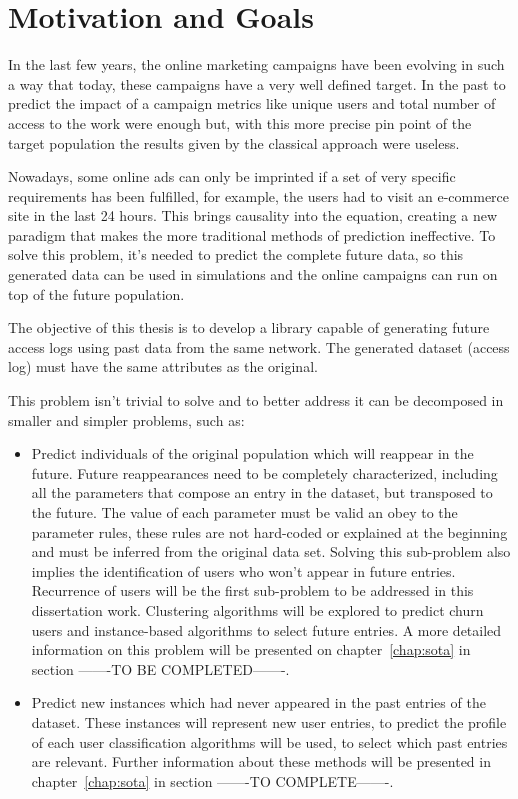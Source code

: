 \section{Motivation and Goals} \label{sec:goals}

In the last few years, the online marketing campaigns have been evolving in such a way that today, these campaigns have a very well defined target.
In the past to predict the impact of a campaign metrics like unique users and total number of access to the work were enough but, with this more precise pin point 
of the target population the results given by the classical approach were useless.

Nowadays, some online ads can only be imprinted if a set of very specific requirements has been fulfilled, for example,
the users had to visit an e-commerce site in the last 24 hours. This brings causality into the equation, creating a new paradigm that makes 
the more traditional methods of prediction ineffective. To solve this problem, it's needed to predict the complete future data, so this generated data
can be used in simulations and the online campaigns can run on top of the future population.

The objective of this thesis is to develop a library capable of generating future access logs using past data from the same network.
The generated dataset (access log) must have the same attributes as the original.

This problem isn't trivial to solve and to better address it can be decomposed in smaller and simpler problems, such as:
\begin{itemize}
    \item Predict individuals of the original population which will reappear in the future. Future reappearances need to be completely characterized, including 
      all the parameters that compose an entry in the dataset, but transposed to the future. The value of each parameter must be valid an obey to the parameter
      rules, these rules are not hard-coded or explained at the beginning and must be inferred from the original data set. Solving this sub-problem also implies the identification
      of users who won't appear in future entries. Recurrence of users will be the first sub-problem to be addressed in this dissertation work. 
      Clustering algorithms will be explored to predict churn users and instance-based algorithms to select future entries. A more detailed information
      on this problem will be presented on chapter~\ref{chap:sota} in section -------TO BE COMPLETED-------.
    \item Predict new instances which had never appeared in the past entries of the dataset.
      These instances will represent new user entries, to predict the profile of each user classification algorithms will be used, to select 
      which past entries are relevant. Further information about these methods will be presented in
      chapter~\ref{chap:sota} in section -------TO COMPLETE-------.
\end{itemize}


